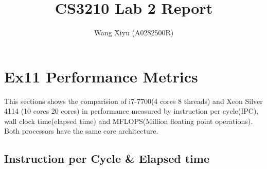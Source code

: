 \documentclass[a4paper]{article}
\begin{document}
\title{CS3210 Lab 2 Report}
\author{
  Wang Xiyu (A0282500R)
}
\maketitle
\section*{Ex11 Performance Metrics}
This sections shows the comparision of i7-7700(4 cores 8 threads) 
and Xeon Silver 4114 (10 cores 20 cores) in performance measured
 by instruction per cycle(IPC), wall clock time(elapsed time)
  and MFLOPS(Million floating point operations). 
  Both processors have the same core architecture.
\subsection*{Instruction per Cycle \& Elapsed time}
\begin{minipage}{0.5\linewidth}
    \noindent{}
\end{minipage}\hfill
\begin{minipage}{0.5\linewidth}
  \noindent{}
\end{minipage}\hfill
\end{document}
